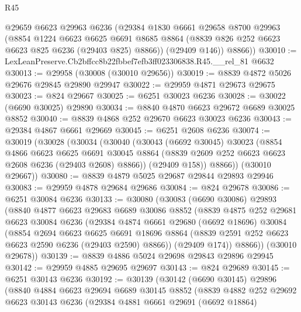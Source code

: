 \begin{lexlean}{R45}
\begin{coremodule}
{        @29659
        @6623
        @29963
        @6236
        (@29384
          @1830
          @6661
          @29658
          @8700
          @29963
          (@8854
            @1224
            @6623
            @6625
            @6691
            @8685
            @8864
            (@8839 @826 @252 @6623 @6623 @825 @6236 (@29403 @825) @8866))
          (@29409 @146))
        @8866))
@30010 := LexLeanPreserve.Cb2bffcc8b22fbbef7efb3ff023306838.R45.__rel_81 @6632
@30013 := @29958 (@30008 (@30010 @29656))
@30019 := @8839 @4872 @5026 @29676 @29845 @29890 @29947
@30022 := @29959 @4871 @29673 @29675
@30023 := @824 @29667
@30025 := @6251 @30023 @6236
@30028 := @30022 (@6690 @30025) @29890
@30034 := @8840 @4870 @6623 @29672 @6689 @30025 @8852
@30040 := @8839 @4868 @252 @29670 @6623 @30023 @6236
@30043 := @29384 @4867 @6661 @29669
@30045 := @6251 @2608 @6236
@30074 := @30019
    (@30028
      (@30034
        (@30040
          (@30043
            (@6692 @30045)
            @30023
            (@8854
              @4866
              @6623
              @6625
              @6691
              @30045
              @8864
              (@8839 @2609 @252 @6623 @6623 @2608 @6236 (@29403 @2608) @8866))
            (@29409 @158))
          @8866))
      (@30010 @29667))
@30080 := @8839 @4879 @5025 @29687 @29844 @29893 @29946
@30083 := @29959 @4878 @29684 @29686
@30084 := @824 @29678
@30086 := @6251 @30084 @6236
@30133 := @30080
    (@30083
      (@6690 @30086)
      @29893
      (@8840
        @4877
        @6623
        @29683
        @6689
        @30086
        @8852
        (@8839
          @4875
          @252
          @29681
          @6623
          @30084
          @6236
          (@29384
            @4874
            @6661
            @29680
            (@6692 @18696)
            @30084
            (@8854
              @2694
              @6623
              @6625
              @6691
              @18696
              @8864
              (@8839 @2591 @252 @6623 @6623 @2590 @6236 (@29403 @2590) @8866))
            (@29409 @174))
          @8866))
      (@30010 @29678))
@30139 := @8839 @4886 @5024 @29698 @29843 @29896 @29945
@30142 := @29959 @4885 @29695 @29697
@30143 := @824 @29689
@30145 := @6251 @30143 @6236
@30192 := @30139
    (@30142
      (@6690 @30145)
      @29896
      (@8840
        @4884
        @6623
        @29694
        @6689
        @30145
        @8852
        (@8839
          @4882
          @252
          @29692
          @6623
          @30143
          @6236
          (@29384
            @4881
            @6661
            @29691
            (@6692 @18864)
}
\end{coremodule}
\end{lexlean}
